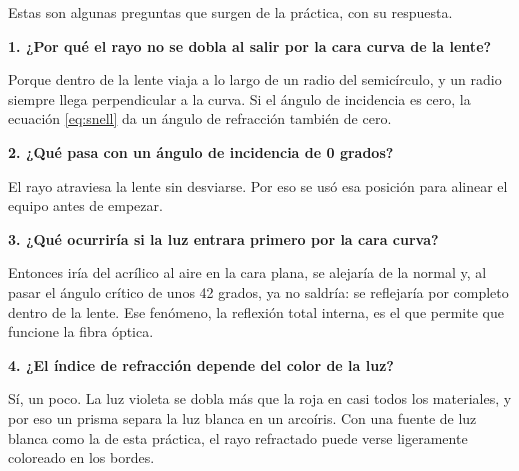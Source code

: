 Estas son algunas preguntas que surgen de la práctica, con su respuesta.

\textbf{1. ¿Por qué el rayo no se dobla al salir por la cara curva de la lente?}

Porque dentro de la lente viaja a lo largo de un radio del semicírculo, y un radio siempre llega perpendicular a la curva. Si el ángulo de incidencia es cero, la ecuación \eqref{eq:snell} da un ángulo de refracción también de cero.

\textbf{2. ¿Qué pasa con un ángulo de incidencia de 0 grados?}

El rayo atraviesa la lente sin desviarse. Por eso se usó esa posición para alinear el equipo antes de empezar.

\textbf{3. ¿Qué ocurriría si la luz entrara primero por la cara curva?}

Entonces iría del acrílico al aire en la cara plana, se alejaría de la normal y, al pasar el ángulo crítico de unos 42 grados, ya no saldría: se reflejaría por completo dentro de la lente. Ese fenómeno, la reflexión total interna, es el que permite que funcione la fibra óptica.

\textbf{4. ¿El índice de refracción depende del color de la luz?}

Sí, un poco. La luz violeta se dobla más que la roja en casi todos los materiales, y por eso un prisma separa la luz blanca en un arcoíris. Con una fuente de luz blanca como la de esta práctica, el rayo refractado puede verse ligeramente coloreado en los bordes.
